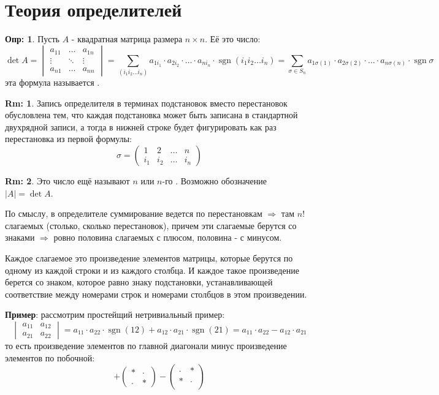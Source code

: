 \documentclass[12pt]{article}
\theoremstyle{definition}
\newtheorem{defn}{Опр:}
\newtheorem{rem}{Rm:}
\DeclareMathOperator{\sgn}{sgn}
\newcommand{\ddsum}[2]{\displaystyle\sum\limits_{#1}^{#2}}
\begin{document}
\section*{Теория определителей}
\begin{defn}
	Пусть $A$ - квадратная матрица размера $n\times n$. Её  это число:
	$$
		\det{A} = \begin{vmatrix}
			a_{11} & \dotsc & a_{1n}\\
			\vdots & \ddots & \vdots \\
			a_{n1} & \dotsc & a_{nn}
		\end{vmatrix} =
		\ddsum{(i_1i_2 \dotsc i_n)}{}a_{1{i_1}}{\cdot}a_{2{i_2}}{\cdot}\dotsc{\cdot}a_{n{i_n}}{\cdot}\sgn{(i_1 i_2 \dotsc i_n )} = \ddsum{\sigma \in S_n}{}a_{1\sigma(1)}{\cdot}a_{2\sigma(2)}{\cdot}\dotsc{\cdot}a_{n\sigma(n)}{\cdot}\sgn{\sigma}
	$$
	эта формула называется .
\end{defn}
\begin{rem}
	Запись определителя в терминах подстановок вместо перестановок обусловлена тем, что каждая подстановка может быть записана в стандартной двухрядной записи, а тогда в нижней строке будет фигурировать как раз перестановка из первой формулы:
	$$
		\sigma = \begin{pmatrix}
			1 & 2 & \dotsc & n \\
			i_1 & i_2 & \dotsc & i_n
		\end{pmatrix}
	$$
\end{rem}
\begin{rem}
	Это число ещё называют  $n$ или  $n$-го . Возможно обозначение $|A| = \det{A}$.
\end{rem}
По смыслу, в определителе суммирование ведется по перестановкам $\Rightarrow$ там $n!$ слагаемых (столько, сколько перестановок), причем эти слагаемые берутся со знаками $\Rightarrow$ ровно половина слагаемых с плюсом, половина - с минусом.

Каждое слагаемое это произведение элементов матрицы, которые берутся по одному из каждой строки и из каждого столбца. И каждое такое произведение берется со знаком, которое равно знаку подстановки, устанавливающей соответствие между номерами строк и номерами столбцов в этом произведении.

\textbf{Пример}: рассмотрим простейщий нетривиальный пример:
$$
	\begin{vmatrix}
		a_{11} & a_{12}\\
		a_{21} & a_{22}
	\end{vmatrix} = a_{11}{\cdot}a_{22}{\cdot}\sgn{(12)} + a_{12}{\cdot}a_{21}{\cdot}\sgn{(21)} = a_{11}{\cdot}a_{22} - a_{12 }{\cdot}a_{21}
$$
то есть произведение элементов по главной диагонали минус произведение элементов по побочной:
$$
	+ \begin{pmatrix}
		* & \cdot\\
		\cdot  & *
	\end{pmatrix} - 
	\begin{pmatrix}
		\cdot & * \\
		* & \cdot\\
	\end{pmatrix}
$$
\end{document}
